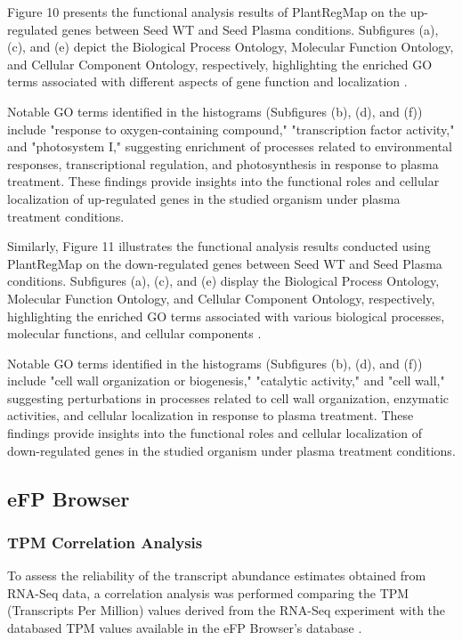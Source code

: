 \documentclass[12pt,letterpaper]{article}
\begin{document}
Figure 10 presents the functional analysis results of PlantRegMap on the up-regulated genes between Seed WT and Seed Plasma conditions. Subfigures (a), (c), and (e) depict the Biological Process Ontology, Molecular Function Ontology, and Cellular Component Ontology, respectively, highlighting the enriched GO terms associated with different aspects of gene function and localization \parencite{tian2020plantregmap}.

Notable GO terms identified in the histograms (Subfigures (b), (d), and (f)) include "response to oxygen-containing compound," "transcription factor activity," and "photosystem I," suggesting enrichment of processes related to environmental responses, transcriptional regulation, and photosynthesis in response to plasma treatment. These findings provide insights into the functional roles and cellular localization of up-regulated genes in the studied organism under plasma treatment conditions.

Similarly, Figure 11 illustrates the functional analysis results conducted using PlantRegMap on the down-regulated genes between Seed WT and Seed Plasma conditions. Subfigures (a), (c), and (e) display the Biological Process Ontology, Molecular Function Ontology, and Cellular Component Ontology, respectively, highlighting the enriched GO terms associated with various biological processes, molecular functions, and cellular components \parencite{tian2020plantregmap}.

Notable GO terms identified in the histograms (Subfigures (b), (d), and (f)) include "cell wall organization or biogenesis," "catalytic activity," and "cell wall," suggesting perturbations in processes related to cell wall organization, enzymatic activities, and cellular localization in response to plasma treatment. These findings provide insights into the functional roles and cellular localization of down-regulated genes in the studied organism under plasma treatment conditions.


\subsection{eFP Browser}


\subsubsection{TPM Correlation Analysis}
To assess the reliability of the transcript abundance estimates obtained from RNA-Seq data, a correlation analysis was performed comparing the TPM (Transcripts Per Million) values derived from the RNA-Seq experiment with the databased TPM values available in the eFP Browser’s database \parencite{wagner2012tpm}.
\end{document}
